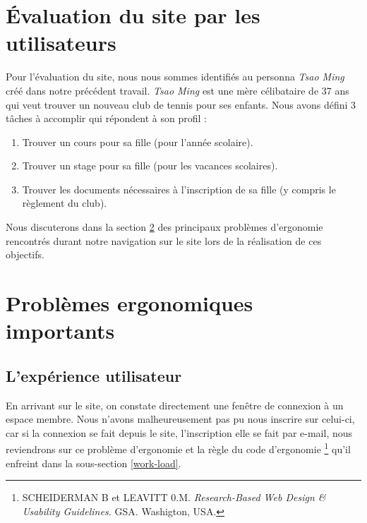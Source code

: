 \documentclass{article}[12pt]
\begin{document}
\section{Évaluation du site par les utilisateurs}
\begin{figure}[H]
	\centering   {}
\end{figure}
Pour l'évaluation du site, nous nous sommes identifiés au personna \textit{Tsao Ming} créé dans notre précédent travail. \textit{Tsao Ming} est une mère célibataire de 37 ans qui veut trouver un nouveau club de tennis pour ses enfants. Nous avons défini 3 tâches à accomplir qui répondent à son profil :
\begin{enumerate}
	\item Trouver un cours pour sa fille (pour l'année scolaire).
	\item Trouver un stage pour sa fille (pour les vacances scolaires).
	\item Trouver les documents nécessaires à l'inscription de sa fille (y compris le règlement du club).
\end{enumerate}
Nous discuterons dans la section \ref{prob_important} des principaux problèmes d'ergonomie rencontrés durant notre navigation sur le site lors de la réalisation de ces objectifs.
\newpage
\section{Problèmes ergonomiques importants}
\label{prob_important}
\subsection{L'expérience utilisateur}
En arrivant sur le site, on constate directement une fenêtre de connexion à un espace membre. Nous n'avons malheureusement pas pu nous inscrire sur celui-ci, car si la connexion se fait depuis le site, l'inscription elle se fait par e-mail, nous reviendrons sur ce problème d'ergonomie et la règle du code d'ergonomie  \footnote{SCHEIDERMAN B et LEAVITT 0.M. \textit{Research-Based Web Design \& Usability Guidelines.} GSA.  Washigton, USA.} qu'il enfreint dans la sous-section \ref{work-load}. 
\end{document}
